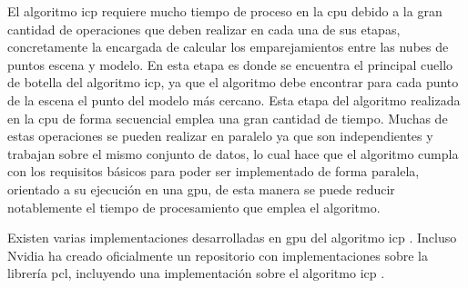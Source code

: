 El algoritmo \gls{icp} requiere mucho tiempo de proceso en la \gls{cpu} debido a la gran cantidad de operaciones que deben realizar en cada una de sus etapas, concretamente la encargada de calcular los emparejamientos entre las nubes de puntos escena y modelo.
En esta etapa es donde se encuentra el principal cuello de botella del algoritmo \gls{icp}, ya que el algoritmo debe encontrar para cada punto de la escena el punto del modelo más cercano.
Esta etapa del algoritmo realizada en la \gls{cpu} de forma secuencial emplea una gran cantidad de tiempo.
Muchas de estas operaciones se pueden realizar en paralelo ya que son independientes y trabajan sobre el mismo conjunto de datos, lo cual hace que el algoritmo cumpla con los requisitos básicos para poder ser implementado de forma paralela, orientado a su ejecución en una \gls{gpu}, de esta manera se puede reducir notablemente el tiempo de procesamiento que emplea el algoritmo.

Existen varias implementaciones desarrolladas en \gls{gpu} del algoritmo \gls{icp} \citep{Langis} \citep{barsukov2013development}.
Incluso Nvidia ha creado oficialmente un repositorio con implementaciones sobre la librería \gls{pcl}, incluyendo una implementación sobre el algoritmo \gls{icp} \citep{LeiFan}.
